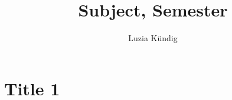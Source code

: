 \documentclass[11pt, a4paper]{article}
\title{Subject, Semester}
\author{Luzia Kündig}
\begin{document}
\maketitle

\section{Title 1}
\end{document}
